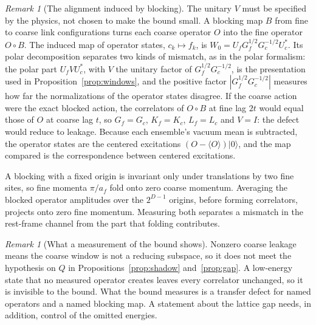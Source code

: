 \documentclass[11pt]{article}
\theoremstyle{remark}
\newtheorem{remark}[proposition]{Remark}
\begin{document}
\begin{remark}[The alignment induced by blocking]
The unitary $V$ must be specified by the physics, not chosen to make the bound small. A blocking map $B$ from fine to coarse link configurations turns each coarse operator $O$ into the fine operator $O\circ B$. The induced map of operator states, $c_k\mapsto f_k$, is $W_0=U_fG_f^{1/2}G_c^{-1/2}U_c^*$. Its polar decomposition separates two kinds of mismatch, as in the polar formalism: the polar part $U_fVU_c^*$, with $V$ the unitary factor of $G_f^{1/2}G_c^{-1/2}$, is the presentation used in Proposition~\ref{prop:windows}, and the positive factor $|G_f^{1/2}G_c^{-1/2}|$ measures how far the normalizations of the operator states disagree. If the coarse action were the exact blocked action, the correlators of $O\circ B$ at fine lag $2t$ would equal those of $O$ at coarse lag $t$, so $G_f=G_c$, $K_f=K_c$, $L_f=L_c$ and $V=I$: the defect would reduce to leakage. Because each ensemble's vacuum mean is subtracted, the operator states are the centered excitations $(O-\langle O\rangle)|0\rangle$, and the map compared is the correspondence between centered excitations.

A blocking with a fixed origin is invariant only under translations by two fine sites, so fine momenta $\pi/a_f$ fold onto zero coarse momentum. Averaging the blocked operator amplitudes over the $2^{D-1}$ origins, before forming correlators, projects onto zero fine momentum. Measuring both separates a mismatch in the rest-frame channel from the part that folding contributes.
\end{remark}

\begin{remark}[What a measurement of the bound shows]
Nonzero coarse leakage means the coarse window is not a reducing subspace, so it does not meet the hypothesis on $Q$ in Propositions~\ref{prop:shadow} and~\ref{prop:gap}. A low-energy state that no measured operator creates leaves every correlator unchanged, so it is invisible to the bound. What the bound measures is a transfer defect for named operators and a named blocking map. A statement about the lattice gap needs, in addition, control of the omitted energies.
\end{remark}
\end{document}
